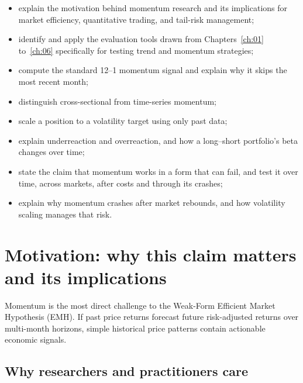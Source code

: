 \begin{itemize}
  \item explain the motivation behind momentum research and its implications for market efficiency, quantitative trading, and tail-risk management;
  \item identify and apply the evaluation tools drawn from Chapters~\ref{ch:01} to~\ref{ch:06} specifically for testing trend and momentum strategies;
  \item compute the standard 12--1 momentum signal and explain why it skips the most recent month;
  \item distinguish cross-sectional from time-series momentum;
  \item scale a position to a volatility target using only past data;
  \item explain underreaction and overreaction, and how a long--short portfolio's beta changes over time;
  \item state the claim that momentum works in a form that can fail, and test it over time, across markets, after costs and through its crashes;
  \item explain why momentum crashes after market rebounds, and how volatility scaling manages that risk.
\end{itemize}

\section{Motivation: why this claim matters and its implications}
\label{sec:09-motivation}

Momentum is the most direct challenge to the Weak-Form Efficient Market Hypothesis (EMH). If past price returns forecast future risk-adjusted returns over multi-month horizons, simple historical price patterns contain actionable economic signals.

\subsection{Why researchers and practitioners care}

